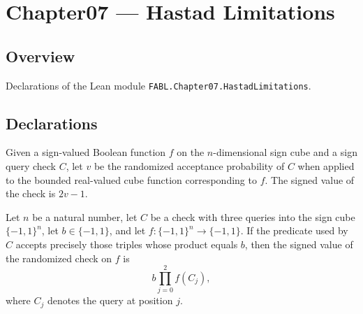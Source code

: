 \chapter{Chapter07 — Hastad Limitations}
\section{Overview}

Declarations of the Lean module \texttt{FABL.Chapter07.HastadLimitations}.

\section{Declarations}

\begin{definition}
\label{FABL.e3LinCheckSignedValue}
\leanok
{}
Given a sign-valued Boolean function $f$ on the $n$-dimensional sign cube and a sign
query check $C$, let $v$ be the randomized acceptance probability of $C$ when applied to
the bounded real-valued cube function corresponding to $f$. The signed value of the
check is $2v-1$.
\end{definition}

\begin{theorem}
\label{FABL.e3LinCheckSignedValue_eq}
\leanok
{}
Let $n$ be a natural number, let $C$ be a check with three queries into the sign cube
$\{-1,1\}^n$, let $b\in\{-1,1\}$, and let $f:\{-1,1\}^n\to\{-1,1\}$. If the predicate
used by $C$ accepts precisely those triples whose product equals $b$, then the signed
value of the randomized check on $f$ is
\[b\prod_{j=0}^{2} f(C_j),\]
where $C_j$ denotes the query at position $j$.
\end{theorem}

